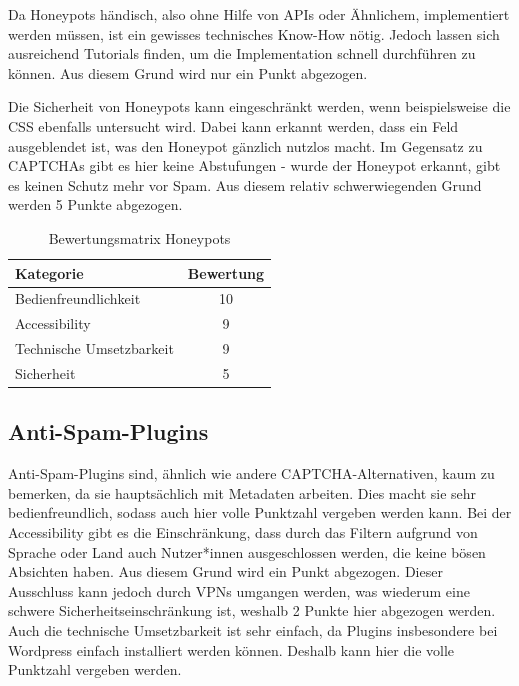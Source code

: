 Da Honeypots händisch, also ohne Hilfe von APIs oder Ähnlichem, implementiert werden müssen, ist ein gewisses technisches Know-How nötig.
Jedoch lassen sich ausreichend Tutorials finden, um die Implementation schnell durchführen zu können.
Aus diesem Grund wird nur ein Punkt abgezogen.

Die Sicherheit von Honeypots kann eingeschränkt werden, wenn beispielsweise die CSS ebenfalls untersucht wird. 
Dabei kann erkannt werden, dass ein Feld ausgeblendet ist, was den Honeypot gänzlich nutzlos macht.
Im Gegensatz zu CAPTCHAs gibt es hier keine Abstufungen - wurde der Honeypot erkannt, gibt es keinen Schutz mehr vor Spam.
Aus diesem relativ schwerwiegenden Grund werden 5 Punkte abgezogen.

\begin{table}[h!]
    \caption{Bewertungsmatrix Honeypots}
    \begin{center}
        \begin{tabular}{l|c}
            Kategorie                       & Bewertung \\\hline
            Bedienfreundlichkeit            & 10         \\
            Accessibility                   & 9        \\
            Technische Umsetzbarkeit        & 9         \\
            Sicherheit                      & 5         
        \end{tabular}
    \end{center}
\end{table}

\pagebreak

\subsection{Anti-Spam-Plugins}
Anti-Spam-Plugins sind, ähnlich wie andere CAPTCHA-Alternativen, kaum zu bemerken, da sie hauptsächlich mit Metadaten arbeiten.
Dies macht sie sehr bedienfreundlich, sodass auch hier volle Punktzahl vergeben werden kann.
Bei der Accessibility gibt es die Einschränkung, dass durch das Filtern aufgrund von Sprache oder Land auch Nutzer*innen ausgeschlossen werden,
die keine bösen Absichten haben. Aus diesem Grund wird ein Punkt abgezogen.
Dieser Ausschluss kann jedoch durch VPNs umgangen werden,
was wiederum eine schwere Sicherheitseinschränkung ist, weshalb 2 Punkte hier abgezogen werden.
Auch die technische Umsetzbarkeit ist sehr einfach, da Plugins insbesondere bei Wordpress einfach installiert werden können.
Deshalb kann hier die volle Punktzahl vergeben werden.


